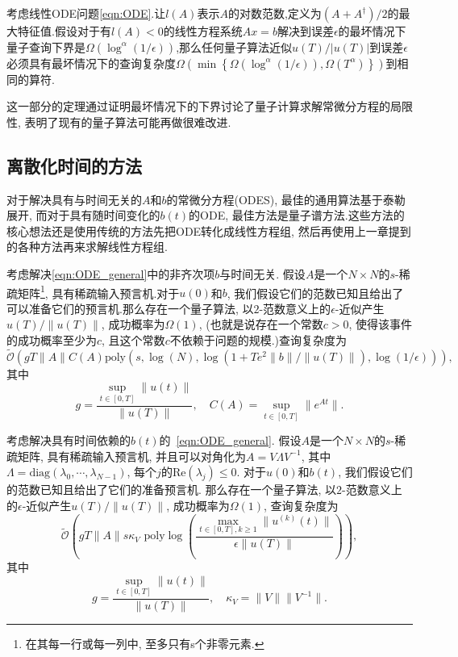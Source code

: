 \begin{theorem}[时间和精度的下界]
	\label{prop:lb_ND_inhomo}
	考虑线性ODE问题\cref{eqn:ODE}.让$l(A)$表示$A$的对数范数,定义为$(A+A^{\dagger})/2$的最大特征值.假设对于有$l(A) < 0$的线性方程系统$Ax = b$解决到误差$\epsilon$的最坏情况下量子查询下界是$\Omega(\log^{\alpha}(1/\epsilon))$,那么任何量子算法近似$u(T)/|u(T)|$到误差$\epsilon$必须具有最坏情况下的查询复杂度$\Omega(\min\left\{ \Omega\left(\log^{\alpha}(1/\epsilon)\right), \Omega\left(T^{\alpha}\right) \right\})$到相同的算符.
	
\end{theorem} \par
这一部分的定理通过证明最坏情况下的下界讨论了量子计算求解常微分方程的局限性, 表明了现有的量子算法可能再做很难改进.
\subsection{离散化时间的方法}
对于解决具有与时间无关的$A$和$b$的常微分方程(ODES), 最佳的通用算法基于泰勒展开\cite{32}, 而对于具有随时间变化的$b(t)$的ODE, 最佳方法是量子谱方法\cite{33}.这些方法的核心想法还是使用传统的方法先把ODE转化成线性方程组, 然后再使用上一章提到的各种方法再来求解线性方程组.

\begin{method}[\cite{32}]\label{lem:DEsolver_TI}
	考虑解决\cref{eqn:ODE_general}中的非齐次项$b$与时间无关.
	假设$A$是一个$N\times N$的$s$-稀疏矩阵\footnote[3]{在其每一行或每一列中, 至多只有s个非零元素.}, 具有稀疏输入预言机.对于$u(0)$和$b$, 我们假设它们的范数已知且给出了可以准备它们的预言机.那么存在一个量子算法, 以$2$-范数意义上的$\epsilon$-近似产生$u(T)/\|u(T)\|$, 成功概率为$\Omega(1)$, (也就是说存在一个常数$c>0$, 使得该事件的成功概率至少为$c$, 且这个常数$c$不依赖于问题的规模.)查询复杂度为
	\begin{equation}
		\widetilde{\mathcal{O}}\left( g T \|A\| C(A) \text{poly}\left(s,\log(N), \log\left(1+{Te^2\|b\|}/{\|u(T)\|}\right), \log(1/\epsilon)\right) \right),
	\end{equation}
	其中
	$$
	g = \frac{\sup_{t\in[0,T]}\|u(t)\| }{\|u(T)\|}, \quad C(A) = \sup_{t\in[0,T]} \|e^{At}\|. 
	$$
\end{method}

\begin{method}[\cite{33}]\label{lem:DEsolver_TD}
	考虑解决具有时间依赖的$b(t)$的~\cref{eqn:ODE_general}.
	假设$A$是一个$N\times N$的$s$-稀疏矩阵, 具有稀疏输入预言机, 并且可以对角化为$A = V\Lambda V^{-1}$, 其中$\Lambda = \text{diag}(\lambda_0,\cdots,\lambda_{N-1})$, 每个$j$的$\text{Re}(\lambda_j) \leq 0$.
	对于$u(0)$和$b(t)$, 我们假设它们的范数已知且给出了它们的准备预言机.
	那么存在一个量子算法, 以$2$-范数意义上的$\epsilon$-近似产生$u(T)/\|u(T)\|$, 成功概率为$\Omega(1)$, 查询复杂度为
	\begin{equation}
		\widetilde{\mathcal{O}}\left( g T \|A\| s \kappa_V \text{~poly}\log\left(\frac{ \max_{t\in[0,T],k \geq 1}\|u^{(k)}(t)\| }{\epsilon \|u(T)\|}\right) \right),
	\end{equation}
	其中
	$$
	g = \frac{\sup_{t\in[0,T]}\|u(t)\| }{\|u(T)\|}, \quad \kappa_V =\|V\|\|V^{-1}\|.  
	$$
\end{method}

